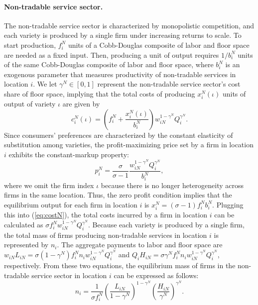 \documentclass[12pt, unicode, a4paper]{article}
\newcommand{\1}{\mbox{1}\hspace{-0.25em}\mbox{l}} %
\begin{document}
\paragraph{Non-tradable service sector.}
The non-tradable service sector is characterized by monopolistic competition, and each variety is produced by a single firm under increasing returns to scale. To start production, $f_i^N$ units of a Cobb-Douglas composite of labor and floor space are needed as a fixed input. Then, producing a unit of output requires $1/b_i^N$ units of the same Cobb-Douglas composite of labor and floor space, where $b_i^N$ is an exogenous parameter that measures productivity of non-tradable services in location $i$. We let $\gamma^N \in [0,1]$ represent the non-tradable service sector's cost share of floor space, implying that the total costs of producing $x_i^N(\iota)$ units of output of variety $\iota$ are given by
\begin{equation}
\label{eq:costN}
    c_i^N(\iota)=\left( f_i^N+\frac{x_i^N(\iota)}{b_i^N} \right) w_{iN}^{1-\gamma^N} Q_i^{\gamma^N}.
\end{equation}
Since consumers' preferences are characterized by the constant elasticity of substitution among varieties, the profit-maximizing price set by a firm in location $i$ exhibits the constant-markup property:
\begin{equation}
\label{eq:markup}
    p_i^N=\frac{\sigma}{\sigma-1} \frac{w_{iN}^{1-\gamma^N} Q_i^{\gamma^N}}{b_i^N},
\end{equation}
where we omit the firm index $\iota$ because there is no longer heterogeneity across firms in the same location. Thus, the zero profit condition implies that the equilibrium output for each firm in location $i$ is $x_i^N=(\sigma-1)f_i^Nb_i^N$. Plugging this into (\ref{eq:costN}), the total costs incurred by a firm in location $i$ can be calculated as $\sigma f_i^N w_{iN}^{1-\gamma^N} Q_i^{\gamma^N}$. Because each variety is produced by a single firm, the total mass of firms producing non-tradable services in location $i$ is represented by $n_i$. The aggregate payments to labor and floor space are $w_{iN}L_{iN}=\sigma(1-\gamma^N)f_i^N n_i w_{iN}^{1-\gamma^N} Q_i^{\gamma^N}$ and $Q_iH_{iN}=\sigma\gamma^N f_i^N n_i w_{iN}^{1-\gamma^N} Q_i^{\gamma^N}$, respectively. From these two equations, the equilibrium mass of firms in the non-tradable service sector in location $i$ can be expressed as follows:
\begin{equation}
\label{eq:variety}
    n_i=\frac{1}{\sigma f_i^N} \left( \frac{L_{iN}}{1-\gamma^N} \right)^{1-\gamma^N} \left( \frac{H_{iN}}{\gamma^N} \right)^{\gamma^N}.
\end{equation}
\end{document}
